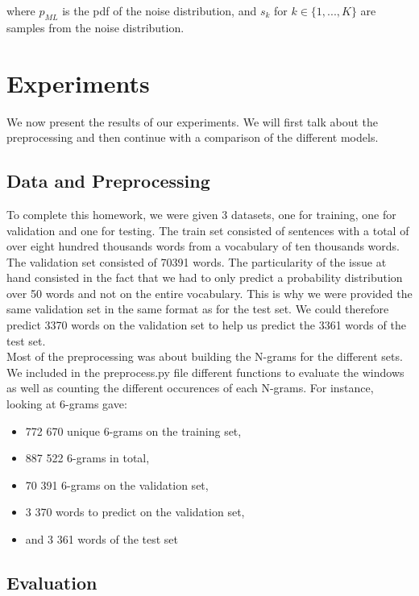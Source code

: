 \documentclass[11pt]{article}
\begin{document}
where $p_{ML}$ is the pdf of the noise distribution, and $s_k$ for $k \in \{1,...,K\}$ are samples from the noise distribution.
 
\section{Experiments}

We now present the results of our experiments. We will first talk about the preprocessing and then continue with a comparison of the different models.

\subsection{Data and Preprocessing}

To complete this homework, we were given 3 datasets, one for training, one for validation and one for testing. The train set consisted of sentences with a total of over eight hundred thousands words from a vocabulary of ten thousands words. The validation set consisted of 70391 words. The particularity of the issue at hand consisted in the fact that we had to only predict a probability distribution over 50 words and not on the entire vocabulary. This is why we were provided the same validation set in the same format as for the test set. We could therefore predict 3370 words on the validation set to help us predict the 3361 words of the test set.\\

\noindent Most of the preprocessing was about building the N-grams for the different sets. We included in the preprocess.py file different functions to evaluate the windows as well as counting the different occurences of each N-grams. For instance, looking at 6-grams gave:

\begin{itemize}
\item 772 670 unique 6-grams on the training set,
\item 887 522 6-grams in total,
\item 70 391 6-grams on the validation set,
\item 3 370 words to predict on the validation set,
\item and 3 361 words of the test set
\end{itemize}

\subsection{Evaluation}
\end{document}
